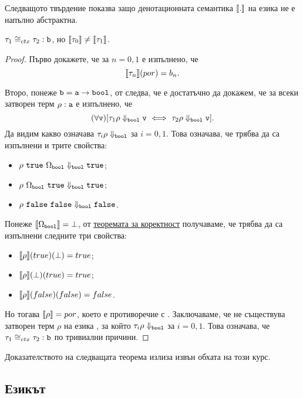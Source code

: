 Следващото твърдение показва защо денотационната семантика $\llbracket{.}\rrbracket$ на езика \PCFPP не е напълно абстрактна.
\begin{framed}
\begin{proposition}
  $\tau_1 \cong_{ctx} \tau_2 : \texttt{b}$, но $\llbracket{\tau_0}\rrbracket \neq \llbracket{\tau_1}\rrbracket$.
\end{proposition}  
\end{framed}
\begin{proof}
  Първо докажете, че за $n = 0,1$ е изпълнено, че
  \[\llbracket{\tau_n}\rrbracket(por) = b_n.\]  
  
  Второ, понеже $\texttt{b} = \texttt{a} \to \texttt{bool}$, от  следва, че е достатъчно да докажем, че
  за всеки затворен терм $\rho:\texttt{a}$ е изпълнено, че
  \[(\forall \texttt{v})[\tau_1\rho \Downarrow_{\texttt{bool}} \texttt{v} \ \Longleftrightarrow\  \tau_2\rho \Downarrow_{\texttt{bool}} \texttt{v}].\]
  Да видим какво означава $\tau_i \rho \Downarrow_{\texttt{bool}}$ за $i = 0,1$.
  Това означава, че трябва да са изпълнени и трите свойства:
  \begin{itemize}
  \item
    $\rho\ \texttt{true}\ \Omega_{\texttt{bool}} \Downarrow_{\texttt{bool}} \texttt{true}$;%
  \item
    $\rho\ \Omega_{\texttt{bool}}\ \texttt{true} \Downarrow_{\texttt{bool}} \texttt{true}$;%
  \item
    $\rho\ \texttt{false}\ \texttt{false} \Downarrow_{\texttt{bool}} \texttt{false}$.
  \end{itemize}
  Понеже $\llbracket{\Omega_{\texttt{bool}}}\rrbracket = \bot$, от \hyperref[th:pcf:soundness]{теоремата за коректност} получаваме, че трябва да са изпълнени следните три свойства:
  \begin{itemize}
  \item
    $\llbracket{\rho}\rrbracket(true)(\bot) = true$;
  \item
    $\llbracket{\rho}\rrbracket(\bot)(true) = true$;
  \item
    $\llbracket{\rho}\rrbracket(false)(false) = false$.
  \end{itemize}
  Но тогава $\llbracket{\rho}\rrbracket = por$, което е противоречие с .
  Заключаваме, че не съществува затворен терм $\rho$ на езика \PCFPP, за който $\tau_i\rho\Downarrow_{\texttt{bool}}$ за $i = 0,1$. Това означава, че $\tau_1 \cong_{ctx} \tau_2 : \texttt{b}$ по тривиални причини.
\end{proof}

Доказателството на следващата теорема излиза извън обхата на този курс.


\subsection{Езикът \PCFPOR}

